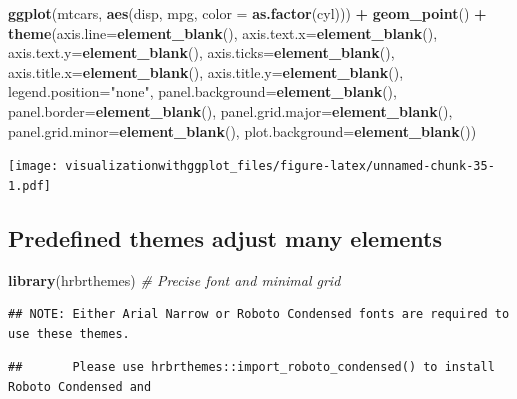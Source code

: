 \documentclass[]{krantz}
\makeatletter
\newenvironment{Shaded}{\begin{snugshade}}{\end{snugshade}}
\newcommand{\CommentTok}[1]{\textcolor[rgb]{0.56,0.35,0.01}{\textit{#1}}}
\newcommand{\DataTypeTok}[1]{\textcolor[rgb]{0.13,0.29,0.53}{#1}}
\newcommand{\KeywordTok}[1]{\textcolor[rgb]{0.13,0.29,0.53}{\textbf{#1}}}
\newcommand{\NormalTok}[1]{#1}
\newcommand{\OperatorTok}[1]{\textcolor[rgb]{0.81,0.36,0.00}{\textbf{#1}}}
\newcommand{\StringTok}[1]{\textcolor[rgb]{0.31,0.60,0.02}{#1}}
\newenvironment{kframe}{%
\medskip{}
\setlength{\fboxsep}{.8em}
 \def\at@end@of@kframe{}%
 \ifinner\ifhmode%
  \def\at@end@of@kframe{\end{minipage}}%
  \begin{minipage}{\columnwidth}%
 \fi\fi%
 \def\FrameCommand##1{\hskip\@totalleftmargin \hskip-\fboxsep
 \colorbox{shadecolor}{##1}\hskip-\fboxsep
     \hskip-\linewidth \hskip-\@totalleftmargin \hskip\columnwidth}%
 \MakeFramed {\advance\hsize-\width
   \@totalleftmargin\z@ \linewidth\hsize
   \@setminipage}}%
 {\par\unskip\endMakeFramed%
 \at@end@of@kframe}
\renewenvironment{Shaded}{\begin{kframe}}{\end{kframe}}
\makeatother
\begin{document}
\begin{Shaded}
\begin{Highlighting}[]
\KeywordTok{ggplot}\NormalTok{(mtcars, }\KeywordTok{aes}\NormalTok{(disp,  mpg, }\DataTypeTok{color =} \KeywordTok{as.factor}\NormalTok{(cyl))) }\OperatorTok{+}\StringTok{ }\KeywordTok{geom_point}\NormalTok{() }\OperatorTok{+}
\StringTok{  }\KeywordTok{theme}\NormalTok{(}\DataTypeTok{axis.line=}\KeywordTok{element_blank}\NormalTok{(),}
      \DataTypeTok{axis.text.x=}\KeywordTok{element_blank}\NormalTok{(),}
      \DataTypeTok{axis.text.y=}\KeywordTok{element_blank}\NormalTok{(),}
      \DataTypeTok{axis.ticks=}\KeywordTok{element_blank}\NormalTok{(),}
      \DataTypeTok{axis.title.x=}\KeywordTok{element_blank}\NormalTok{(),}
      \DataTypeTok{axis.title.y=}\KeywordTok{element_blank}\NormalTok{(),}
      \DataTypeTok{legend.position=}\StringTok{"none"}\NormalTok{,}
      \DataTypeTok{panel.background=}\KeywordTok{element_blank}\NormalTok{(),}
      \DataTypeTok{panel.border=}\KeywordTok{element_blank}\NormalTok{(),}
      \DataTypeTok{panel.grid.major=}\KeywordTok{element_blank}\NormalTok{(),}
      \DataTypeTok{panel.grid.minor=}\KeywordTok{element_blank}\NormalTok{(),}
      \DataTypeTok{plot.background=}\KeywordTok{element_blank}\NormalTok{())}
\end{Highlighting}
\end{Shaded}

\texttt{[image: visualizationwithggplot\_files/figure-latex/unnamed-chunk-35-1.pdf]}

\hypertarget{predefined-themes-adjust-many-elements}{%
\subsection{Predefined themes adjust many elements}\label{predefined-themes-adjust-many-elements}}

\begin{Shaded}
\begin{Highlighting}[]
\KeywordTok{library}\NormalTok{(hrbrthemes) }\CommentTok{# Precise font and minimal grid}
\end{Highlighting}
\end{Shaded}

\begin{verbatim}
## NOTE: Either Arial Narrow or Roboto Condensed fonts are required to use these themes.
\end{verbatim}

\begin{verbatim}
##       Please use hrbrthemes::import_roboto_condensed() to install Roboto Condensed and
\end{verbatim}
\end{document}
